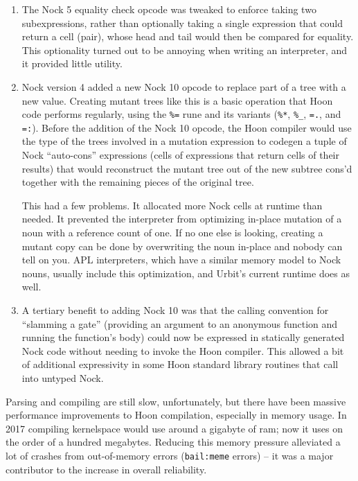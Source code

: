 \documentclass[twoside]{article}
\begin{document}
\begin{enumerate}
  \item  The Nock 5 equality check opcode was tweaked to enforce taking two subexpressions, rather than optionally taking a single expression that could return a cell (pair), whose head and tail would then be compared for equality.  This optionality turned out to be annoying when writing an interpreter, and it provided little utility.
  \item  Nock version 4 added a new Nock 10 opcode to replace part of a tree with a new value.  Creating mutant trees like this is a basic operation that Hoon code performs regularly, using the \lstinline[style=inlinecode]{%=} rune and its variants (\lstinline[style=inlinecode]{%*}, \lstinline[style=inlinecode]{%_}, \lstinline[style=inlinecode]{=.}, and \lstinline[style=inlinecode]{=:}).  Before the addition of the Nock 10 opcode, the Hoon compiler would use the type of the trees involved in a mutation expression to codegen a tuple of Nock ``auto-cons'' expressions (cells of expressions that return cells of their results) that would reconstruct the mutant tree out of the new subtree cons'd together with the remaining pieces of the original tree.
  
  This had a few problems.  It allocated more Nock cells at runtime than needed.  It prevented the interpreter from optimizing in-place mutation of a noun with a reference count of one.  If no one else is looking, creating a mutant copy can be done by overwriting the noun in-place and nobody can tell on you.  APL interpreters, which have a similar memory model to Nock nouns, usually include this optimization, and Urbit's current runtime does as well.

  \item  A tertiary benefit to adding Nock 10 was that the calling convention for ``slamming a gate'' (providing an argument to an anonymous function and running the function's body) could now be expressed in statically generated Nock code without needing to invoke the Hoon compiler.  This allowed a bit of additional expressivity in some Hoon standard library routines that call into untyped Nock.
\end{enumerate}

Parsing and compiling are still slow, unfortunately, but there have been massive performance improvements to Hoon compilation, especially in memory usage.  In 2017 compiling kernelspace would use around a gigabyte of {\sc ram}; now it uses on the order of a hundred megabytes.  Reducing this memory pressure alleviated a lot of crashes from out-of-memory errors (\lstinline[style=inlinecode]{bail:meme} errors) – it was a major contributor to the increase in overall reliability.
\end{document}
